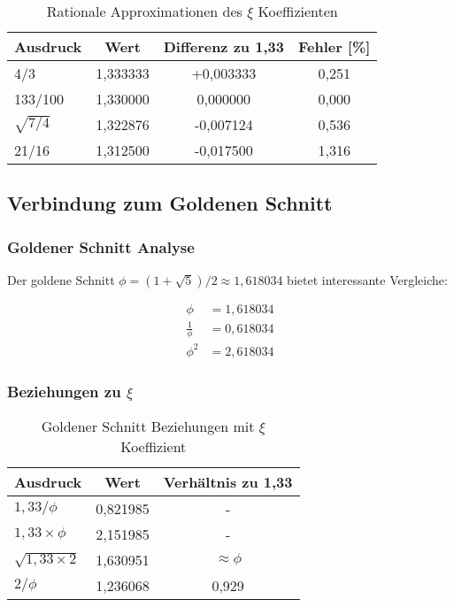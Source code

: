 \documentclass[12pt,a4paper]{article}
\newcommand{\myphi}{\ensuremath{\phi}}
\newcommand{\mytimes}{\ensuremath{\times}}
\newcommand{\myapprox}{\ensuremath{\approx}}
\begin{document}
	\begin{table}[htbp]
		\centering
		\begin{tabular}{lccc}
			\toprule
			\textbf{Ausdruck} & \textbf{Wert} & \textbf{Differenz zu 1,33} & \textbf{Fehler [\%]} \\
			\midrule
			4/3 & 1,333333 & +0,003333 & 0,251 \\
			133/100 & 1,330000 & 0,000000 & 0,000 \\
			$\sqrt{7/4}$ & 1,322876 & -0,007124 & 0,536 \\
			21/16 & 1,312500 & -0,017500 & 1,316 \\
			\bottomrule
		\end{tabular}
		\caption{Rationale Approximationen des $\xi$ Koeffizienten}
		\label{tab:rationale_approximationen}
	\end{table}
	
	\subsection{Verbindung zum Goldenen Schnitt}
	\label{subsec:goldener_schnitt}
	
	\subsubsection{Goldener Schnitt Analyse}
	\label{subsubsec:goldener_schnitt_analyse}
	
	Der goldene Schnitt $\myphi = (1 + \sqrt{5})/2 \myapprox 1,618034$ bietet interessante Vergleiche:
	
	\begin{align}
		\myphi &= 1,618034 \\
		\frac{1}{\myphi} &= 0,618034 \\
		\myphi^2 &= 2,618034
	\end{align}
	
	\subsubsection{Beziehungen zu $\xi$}
	\label{subsubsec:xi_goldene_beziehungen}
	
	\begin{table}[htbp]
		\centering
		\begin{tabular}{lcc}
			\toprule
			\textbf{Ausdruck} & \textbf{Wert} & \textbf{Verhältnis zu 1,33} \\
			\midrule
			$1,33/\myphi$ & 0,821985 & - \\
			$1,33 \mytimes \myphi$ & 2,151985 & - \\
			$\sqrt{1,33 \mytimes 2}$ & 1,630951 & $\myapprox \myphi$ \\
			$2/\myphi$ & 1,236068 & 0,929 \\
			\bottomrule
		\end{tabular}
		\caption{Goldener Schnitt Beziehungen mit $\xi$ Koeffizient}
		\label{tab:goldener_schnitt_beziehungen}
	\end{table}
	
\end{document}
